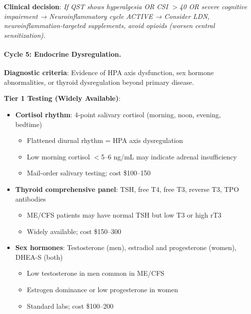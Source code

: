 \textbf{Clinical decision}: \textit{If QST shows hyperalgesia OR CSI $>$40 OR severe cognitive impairment → Neuroinflammatory cycle ACTIVE → Consider LDN, neuroinflammation-targeted supplements, avoid opioids (worsen central sensitization).}

\paragraph{Cycle 5: Endocrine Dysregulation.}

\textbf{Diagnostic criteria}: Evidence of HPA axis dysfunction, sex hormone abnormalities, or thyroid dysregulation beyond primary disease.

\textbf{Tier 1 Testing (Widely Available)}:
\begin{itemize}
    \item \textbf{Cortisol rhythm}: 4-point salivary cortisol (morning, noon, evening, bedtime)
    \begin{itemize}
        \item Flattened diurnal rhythm = HPA axis dysregulation
        \item Low morning cortisol $<$5--6 ng/mL may indicate adrenal insufficiency
        \item Mail-order salivary testing; cost \$100--150
    \end{itemize}

    \item \textbf{Thyroid comprehensive panel}: TSH, free T4, free T3, reverse T3, TPO antibodies
    \begin{itemize}
        \item ME/CFS patients may have normal TSH but low T3 or high rT3
        \item Widely available; cost \$150--300
    \end{itemize}

    \item \textbf{Sex hormones}: Testosterone (men), estradiol and progesterone (women), DHEA-S (both)
    \begin{itemize}
        \item Low testosterone in men common in ME/CFS
        \item Estrogen dominance or low progesterone in women
        \item Standard labs; cost \$100--200
    \end{itemize}
\end{itemize}

